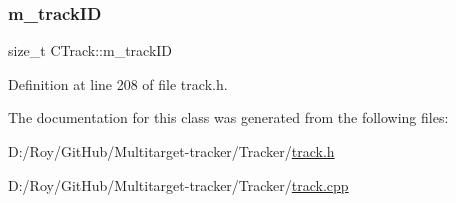 \subsubsection{\texorpdfstring{m\+\_\+track\+ID}{m\_trackID}}
{\footnotesize\ttfamily size\+\_\+t C\+Track\+::m\+\_\+track\+ID}



Definition at line 208 of file track.\+h.



The documentation for this class was generated from the following files\+:\begin{DoxyCompactItemize}
\item 
D\+:/\+Roy/\+Git\+Hub/\+Multitarget-\/tracker/\+Tracker/\mbox{\hyperlink{track_8h}{track.\+h}}\item 
D\+:/\+Roy/\+Git\+Hub/\+Multitarget-\/tracker/\+Tracker/\mbox{\hyperlink{track_8cpp}{track.\+cpp}}\end{DoxyCompactItemize}
